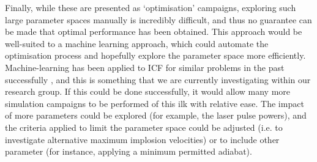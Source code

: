 Finally, while these are presented as `optimisation' campaigns, exploring such large parameter spaces manually is incredibly difficult, and thus no guarantee can be made that optimal performance has been obtained. This approach would be well-suited to a machine learning approach, which could automate the optimisation process and hopefully explore the parameter space more efficiently. Machine-learning has been applied to ICF for similar problems in the past successfully \cite{Hatfield2019}, and this is something that we are currently investigating within our research group. If this could be done successfully, it would allow many more simulation campaigns to be performed of this ilk with relative ease. The impact of more parameters could be explored (for example, the laser pulse powers), and the criteria applied to limit the parameter space could be adjusted (i.e. to investigate alternative maximum implosion velocities) or to include other parameter (for instance, applying a minimum permitted adiabat).






















